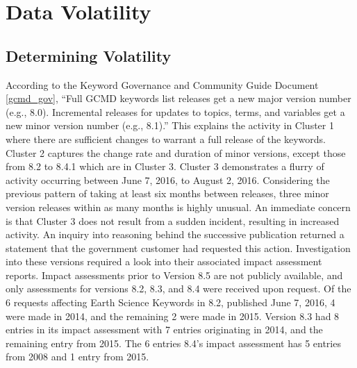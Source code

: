
\chapter{Data Volatility}

\section{Determining Volatility}

According to the Keyword Governance and Community Guide Document \ref{gcmd_gov}, “Full GCMD keywords list releases get a new major version number (e.g., 8.0). Incremental releases for updates to topics, terms, and variables get a new minor version number (e.g., 8.1).”  This explains the activity in Cluster 1 where there are sufficient changes to warrant a full release of the keywords.  Cluster 2 captures the change rate and duration of minor versions, except those from 8.2 to 8.4.1 which are in Cluster 3.  Cluster 3 demonstrates a flurry of activity occurring between June 7, 2016, to August 2, 2016.  Considering the previous pattern of taking at least six months between releases, three minor version releases within as many months is highly unusual.  An immediate concern is that Cluster 3 does not result from a sudden incident, resulting in increased activity.  An inquiry into reasoning behind the successive publication returned a statement that the government customer had requested this action.  Investigation into these versions required a look into their associated impact assessment reports.  Impact assessments prior to Version 8.5 are not publicly available, and only assessments for versions 8.2, 8.3, and 8.4 were received upon request.  Of the 6 requests affecting Earth Science Keywords in 8.2, published June 7, 2016, 4 were made in 2014, and the remaining 2 were made in 2015.  Version 8.3 had 8 entries in its impact assessment with 7 entries originating in 2014, and the remaining entry from 2015.  The 6 entries 8.4’s impact assessment has 5 entries from 2008 and 1 entry from 2015.

